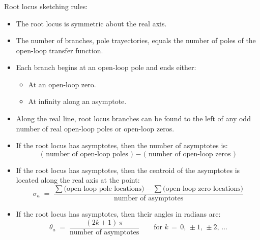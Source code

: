 \documentclass[ 10pt, xcolor = dvipsnames]{beamer}
\begin{document}
\begin{frame}[allowframebreaks]
\frametitle{\insertsection}

Root locus sketching rules:
\begin{itemize}
\item The root locus is symmetric about the real axis. 
\item The number of branches, \ie pole trayectories, equals the number of poles \linebreak of the open-loop transfer function. 
\item Each branch begins at an open-loop pole and ends either: 
\begin{itemize}
\item At an open-loop zero. 
\item At infinity along an asymptote. 
\end{itemize}
\item Along the real line, root locus branches can be found to the left of any \linebreak odd number of real open-loop poles or open-loop zeros. 
\framebreak

\item If the root locus has asymptotes, then the number of asymptotes is: 
\[
\text{ ( number of open-loop poles ) } -  
\text{ ( number of open-loop zeros ) }
\]
\item If the root locus has asymptotes, then the centroid of the asymptotes is located along the real axis at the point: 
\[
\sigma_a \; = \; 
\frac{ \sum \text{(open-loop pole locations)} - \sum \text{(open-loop zero locations)} }{ \text{number of asymptotes} }
\]
\item If the root locus has asymptotes, then their angles in radians are: 
\[
\theta_a \; = \; 
\frac{ ( 2k + 1 ) \, \pi }{ \text{number of asymptotes} }
\qquad
\text{for } k \, = \, 0, \, \pm 1, \, \pm 2, \, \dots
\]
\end{itemize}

\end{frame}
\end{document}
